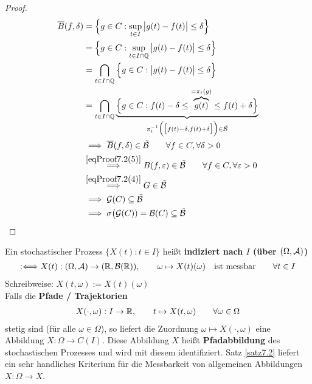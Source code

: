 \begin{proof}
\begin{align*}
\overline{B}(f,\delta)
&=\Big\lbrace g\in C:\sup\limits_{t\in I}\big|g(t)-f(t)\big|\leq\delta\Big\rbrace\\
&=\Big\lbrace g\in C:\sup\limits_{t\in I\cap\mathbb{Q}}\big|g(t)-f(t)\big|\leq\delta\Big\rbrace\\
&=\bigcap\limits_{t\in I\cap\mathbb{Q}}\Big\lbrace g\in C:\big|g(t)-f(t)\big|\leq\delta\Big\rbrace\\
&=\bigcap\limits_{t\in I\cap\mathbb{Q}}\underbrace{\Big\lbrace g\in C:f(t)-\delta\leq \overbrace{g(t)}^{=\pi_t(g)}\leq f(t)+\delta\Big\rbrace}_{\pi_t^{-1}\Big(\big[f(t)-\delta,f(t)+\delta\big]\Big)\in\tilde{\mathcal{B}}}\\
&\implies
\overline{B}(f,\delta)\in\tilde{\mathcal{B}}\qquad\forall f\in C,\forall\delta>0\\
&\stackrel{\eqref{eqProof7.2(5)}}{\implies}
B(f,\varepsilon)\in\tilde{\mathcal{B}}\qquad\forall f\in C,\forall\varepsilon>0\\
&\stackrel{\eqref{eqProof7.2(4)}}{\implies}
G\in\tilde{\mathcal{B}}\\
&\implies
\mathcal{G}(C)\subseteq\tilde{\mathcal{B}}\\
&\implies\sigma\big(\mathcal{G}(C))=\mathcal{B}(C)\subseteq\tilde{\mathcal{B}}
\end{align*}
\end{proof}

Ein stochastischer Prozess $\big\lbrace X(t):t\in I\big\rbrace$ heißt \textbf{indiziert nach $I$ (über $(\Omega,\mathcal{A})$)}
\begin{align*}
:\Longleftrightarrow X(t):(\Omega,\mathcal{A})\to(\mathbb{R},\mathcal{B}(\mathbb{R})),
\qquad\omega\mapsto X(t)(\omega)\quad
\text{ist messbar}\qquad\forall t\in I
\end{align*}
Schreibweise: $X(t,\omega):=X(t)(\omega)$\\
Falls die \textbf{Pfade / Trajektorien}
\begin{align*}
X(\cdot,\omega):I\to\mathbb{R},\qquad t\mapsto X(t,\omega)\qquad\forall \omega\in\Omega
\end{align*}
stetig sind (für alle $\omega\in\Omega$), so liefert die Zuordnung $\omega\mapsto X(\cdot,\omega)$ eine Abbildung $X:\Omega\to C(I)$. Diese Abbildung $X$ heißt \textbf{Pfadabbildung} des stochastischen Prozesses und wird mit diesem identifiziert.\nl
Satz \ref{satz7.2} liefert ein sehr handliches Kriterium für die Messbarkeit von allgemeinen Abbildungen $X:\Omega\to X$.

